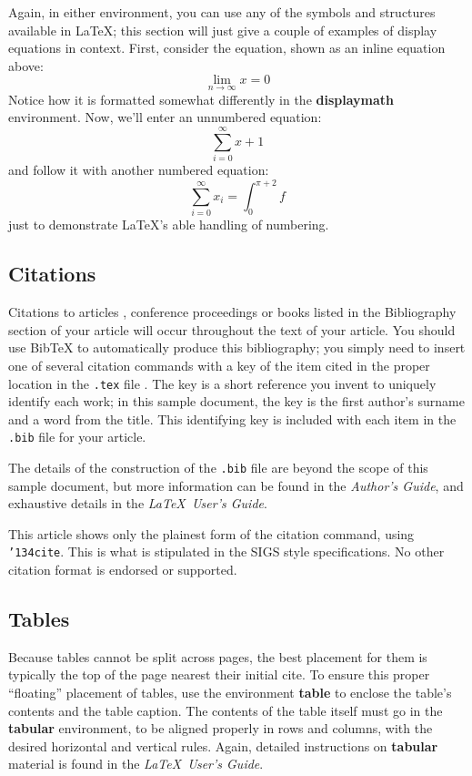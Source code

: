 \documentclass{sig-alternate}
\begin{document}
Again, in either environment, you can use any of the symbols
and structures available in \LaTeX; this section will just
give a couple of examples of display equations in context.
First, consider the equation, shown as an inline equation above:
\begin{equation}\lim_{n\rightarrow \infty}x=0\end{equation}
Notice how it is formatted somewhat differently in
the \textbf{displaymath}
environment.  Now, we'll enter an unnumbered equation:
\begin{displaymath}\sum_{i=0}^{\infty} x + 1\end{displaymath}
and follow it with another numbered equation:
\begin{equation}\sum_{i=0}^{\infty}x_i=\int_{0}^{\pi+2} f\end{equation}
just to demonstrate \LaTeX's able handling of numbering.

\subsection{Citations}
Citations to articles \cite{bowman:reasoning,
clark:pct, braams:babel, herlihy:methodology},
conference proceedings \cite{clark:pct} or
books \cite{salas:calculus, Lamport:LaTeX} listed
in the Bibliography section of your
article will occur throughout the text of your article.
You should use BibTeX to automatically produce this bibliography;
you simply need to insert one of several citation commands with
a key of the item cited in the proper location in
the \texttt{.tex} file \cite{Lamport:LaTeX}.
The key is a short reference you invent to uniquely
identify each work; in this sample document, the key is
the first author's surname and a
word from the title.  This identifying key is included
with each item in the \texttt{.bib} file for your article.

The details of the construction of the \texttt{.bib} file
are beyond the scope of this sample document, but more
information can be found in the \textit{Author's Guide},
and exhaustive details in the \textit{\LaTeX\ User's
Guide}\cite{Lamport:LaTeX}.

This article shows only the plainest form
of the citation command, using \texttt{{\char'134}cite}.
This is what is stipulated in the SIGS style specifications.
No other citation format is endorsed or supported.

\subsection{Tables}
Because tables cannot be split across pages, the best
placement for them is typically the top of the page
nearest their initial cite.  To
ensure this proper ``floating'' placement of tables, use the
environment \textbf{table} to enclose the table's contents and
the table caption.  The contents of the table itself must go
in the \textbf{tabular} environment, to
be aligned properly in rows and columns, with the desired
horizontal and vertical rules.  Again, detailed instructions
on \textbf{tabular} material
is found in the \textit{\LaTeX\ User's Guide}.
\end{document}
